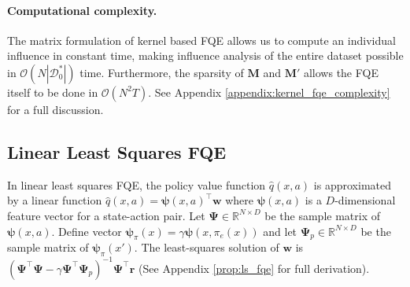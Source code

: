 \documentclass{article}
\begin{document}
\paragraph{Computational complexity.} The matrix formulation of kernel based FQE allows us to compute an individual influence in constant time, making influence analysis of the entire dataset possible in $\mathcal{O}(N |\mathcal{D}^*_0|)$ time. Furthermore, the sparsity of $\mathbf{M}$ and $\mathbf{M}'$ allows the FQE itself to be done in $\mathcal{O}(N^2 T)$. See Appendix \ref{appendix:kernel_fqe_complexity} for a full discussion.

\subsection{Linear Least Squares FQE}

\newcommand{\feature}{\pmb{\psi}}
\newcommand{\Feature}{\mathbf{\Psi}}
In linear least squares FQE, the policy value function $\hat{q}(x,a)$ is approximated by a linear function $\hat{q}(x,a) = \feature(x,a)^\top \mathbf{w}$ where $\feature(x,a)$ is a $D$-dimensional feature vector for a state-action pair. Let $\Feature \in \mathbb{R}^{N \times D}$ be the sample matrix of $\feature(x,a)$. Define vector $\feature_{\pi}(x) = \gamma \feature(x, \pi_e(x))$ and let $\Feature_p \in \mathbb{R}^{N \times D}$ be the sample matrix of $\feature_{\pi}(x')$. The least-squares solution of $\mathbf{w}$ is 
    $(\Feature^\top \Feature - \gamma \Feature^\top \Feature_p)^{-1}\Feature^\top \mathbf{r}$
(See Appendix \ref{prop:ls_fqe} for full derivation).
\end{document}

